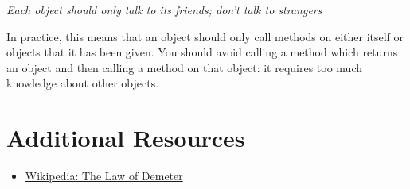 \begin{center}
    \textit{Each object should only talk to its friends; don't talk to strangers}
\end{center}

In practice, this means that an object should only call methods on either itself or objects that it has been given. You should avoid calling a method which returns an object and then calling a method on that object: it requires too much knowledge about other objects.



\section{Additional Resources}

\begin{itemize}[leftmargin=*]
    \item \href{https://en.wikipedia.org/wiki/Law\_of\_Demeter}{Wikipedia: The Law of Demeter}
\end{itemize}

